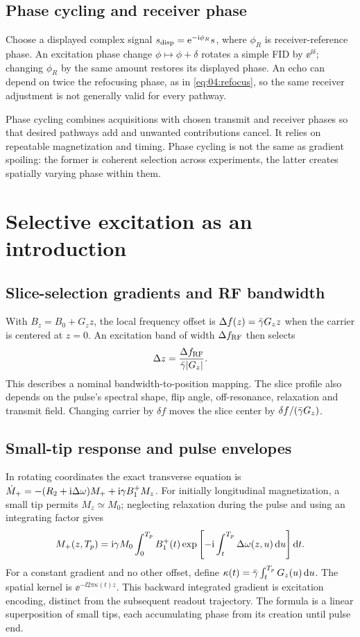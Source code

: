 \subsection{Phase cycling and receiver phase}
Choose a displayed complex signal $s_{\rm disp}=\mathrm{e}^{-\mathrm{i}\phi_R}s$,
where $\phi_R$ is receiver-reference phase. An excitation phase change
$\phi\mapsto\phi+\delta$ rotates a simple FID by $\ee^{\ii\delta}$;
changing $\phi_R$ by the same amount restores its displayed phase.
An echo can depend on twice the refocusing phase, as in
\cref{eq:04:refocus}, so the same receiver adjustment is not generally
valid for every pathway.

Phase cycling combines acquisitions with chosen transmit and receiver
phases so that desired pathways add and unwanted contributions cancel.
It relies on repeatable magnetization and timing. Phase cycling is not
the same as gradient spoiling: the former is coherent selection across
experiments, the latter creates spatially varying phase within them.

\section{Selective excitation as an introduction}
\label{sec:04:selective-excitation-as-an-introduction}
\subsection{Slice-selection gradients and RF bandwidth}
With $B_z=B_0+G_zz$, the local frequency offset is
$\Delta f(z)=\bar{\gamma} G_zz$ when the carrier is centered at $z=0$.
An excitation band of width $\Delta f_{\rm RF}$ then selects
\begin{equation}
 \Delta z=\frac{\Delta f_{\rm RF}}{\bar{\gamma}\lvert G_z\rvert}.
 \label{eq:04:slice}
\end{equation}
This describes a nominal bandwidth-to-position mapping. The slice profile
also depends on the pulse's spectral shape, flip angle, off-resonance,
relaxation and transmit field. Changing carrier by $\delta f$
moves the slice center by $\delta f/(\bar{\gamma} G_z)$.

\subsection{Small-tip response and pulse envelopes}
In rotating coordinates the exact transverse equation is
$\dot M_+=-(R_2+\mathrm{i}\Delta\omega)M_++\mathrm{i}\gamma B_{1}^{+} M_z$.
For initially longitudinal magnetization, a small tip permits
$M_z\simeq M_0$; neglecting relaxation during the pulse and using an
integrating factor gives
\begin{equation}
 M_+(z,T_p)=\mathrm{i}\gamma M_0\int_0^{T_p}B_{1}^{+}(t)
       \exp\left[-\mathrm{i}\int_t^{T_p}\Delta\omega(z,u)\mathop{}\!\mathrm{d} u\right]\mathop{}\!\mathrm{d} t .
 \label{eq:04:sta}
\end{equation}
For a constant gradient and no other offset,
define $\kappa(t)=\bar{\gamma}\int_t^{T_p}G_z(u)\mathop{}\!\mathrm{d} u$.
The spatial kernel is $\ee^{-\ii2\pi\kappa(t)z}$.
This backward integrated gradient is excitation encoding, distinct from
the subsequent readout trajectory. The formula is a linear superposition
of small tips, each accumulating phase from its creation until pulse end.

